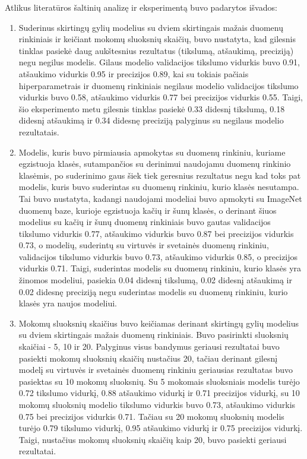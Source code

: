 \documentclass{VUMIFPSbakalaurinis}
\begin{document}
Atlikus literatūros šaltinių analizę ir eksperimentą buvo padarytos išvados:
\begin{enumerate}
  \item Suderinus skirtingų gylių modelius su dviem skirtingais mažais duomenų rinkiniais ir keičiant mokomų sluoksnių skaičių, buvo nustatyta, kad gilesnis tinklas pasiekė daug aukštesnius rezultatus (tikslumą, atšaukimą, preciziją) negu negilus modelis. Gilaus modelio validacijos tikslumo vidurkis buvo 0.91, atšaukimo vidurkis 0.95 ir precizijos 0.89, kai su tokiais pačiais hiperparametrais ir duomenų rinkiniais negilaus modelio validacijos tikslumo vidurkis buvo 0.58, atšaukimo vidurkis 0.77 bei precizijos vidurkis 0.55. Taigi, šio eksperimento metu gilesnis tinklas pasiekė 0.33 didesnį tikslumą, 0.18 didesnį atšaukimą ir 0.34 didesnę preciziją palyginus su negilaus modelio rezultatais.
  \item Modelis, kuris buvo pirmiausia apmokytas su duomenų rinkiniu, kuriame egzistuoja klasės, sutampančios su derinimui naudojamu duomenų rinkinio klasėmis, po suderinimo gaus šiek tiek geresnius rezultatus negu kad toks pat modelis, kuris buvo suderintas su duomenų rinkiniu, kurio klasės nesutampa. Tai buvo nustatyta, kadangi naudojami modeliai buvo apmokyti su ImageNet duomenų baze, kurioje egzistuoja kačių ir šunų klasės, o derinant šiuos modelius su kačių ir šunų duomenų rinkiniais buvo gautas validacijos tikslumo vidurkis 0.77, atšaukimo vidurkis buvo 0.87 bei precizijos vidurkis 0.73, o modelių, suderintų su virtuvės ir svetainės duomenų rinkiniu, validacijos tikslumo vidurkis buvo 0.73, atšaukimo vidurkis 0.85, o precizijos vidurkis 0.71. Taigi, suderintas modelis su duomenų rinkiniu, kurio klasės yra žinomos modeliui, pasiekia 0.04 didesnį tikslumą, 0.02 didesnį atšaukimą ir 0.02 didesnę preciziją negu suderintas modelis su duomenų rinkiniu, kurio klasės yra naujos modeliui.
  \item Mokomų sluoksnių skaičius buvo keičiamas derinant skirtingų gylių modelius su dviem skirtingais mažais duomenų rinkiniais. Buvo pasirinkti sluoksnių skaičiai - 5, 10 ir 20. Palyginus visus bandymus geriausi rezultatai buvo pasiekti mokomų sluoksnių skaičių nustačius 20, tačiau derinant gilesnį modelį su virtuvės ir svetainės duomenų rinkiniu geriausias rezultatas buvo pasiektas su 10 mokomų sluoksnių. Su 5 mokomais sluoksniais modelis turėjo 0.72 tikslumo vidurkį, 0.88 atšaukimo vidurkį ir 0.71 precizijos vidurkį, su 10 mokomų sluoksnių modelio tikslumo vidurkis buvo 0.73, atšaukimo vidurkis 0.75 bei precizijos vidurkis 0.71. Tačiau su 20 mokomų sluoksnių modelis turėjo 0.79 tikslumo vidurkį, 0.95 atšaukimo vidurkį ir 0.75 precizijos vidurkį. Taigi, nustačius mokomų sluoksnių skaičių kaip 20, buvo pasiekti geriausi rezultatai.
\end{enumerate}
\end{document}
